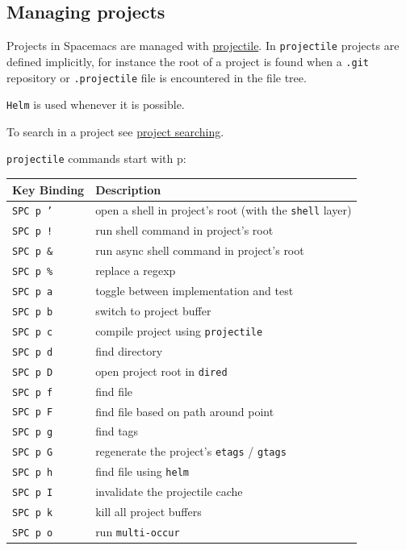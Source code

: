 \documentclass[11pt]{article}
\begin{document}
\subsection{Managing projects}
\label{sec:org7b78cc6}
Projects in Spacemacs are managed with \href{https://github.com/bbatsov/projectile}{projectile}. In \texttt{projectile} projects
are defined implicitly, for instance the root of a project is found when a
\texttt{.git} repository or \texttt{.projectile} file is encountered in the file tree.

\texttt{Helm} is used whenever it is possible.

To search in a project see \hyperref[sec:org7eedc5e]{project searching}.

\texttt{projectile} commands start with p:

\begin{center}
\begin{tabular}{ll}
Key Binding & Description\\
\hline
\texttt{SPC p '​} & open a shell in project's root (with the \texttt{shell} layer)\\
\texttt{SPC p !} & run shell command in project's root\\
\texttt{SPC p \&} & run async shell command in project's root\\
\texttt{SPC p \%} & replace a regexp\\
\texttt{SPC p a} & toggle between implementation and test\\
\texttt{SPC p b} & switch to project buffer\\
\texttt{SPC p c} & compile project using \texttt{projectile}\\
\texttt{SPC p d} & find directory\\
\texttt{SPC p D} & open project root in \texttt{dired}\\
\texttt{SPC p f} & find file\\
\texttt{SPC p F} & find file based on path around point\\
\texttt{SPC p g} & find tags\\
\texttt{SPC p G} & regenerate the project's \texttt{etags} / \texttt{gtags}\\
\texttt{SPC p h} & find file using \texttt{helm}\\
\texttt{SPC p I} & invalidate the projectile cache\\
\texttt{SPC p k} & kill all project buffers\\
\texttt{SPC p o} & run \texttt{multi-occur}\\

\end{tabular}
\end{center}
\end{document}
